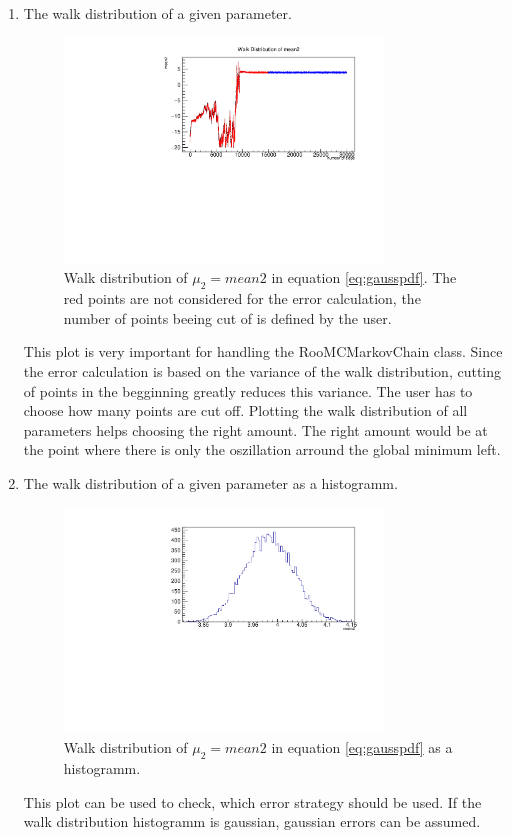 \documentclass[english]{uzhpub}
\begin{document}
\begin{enumerate}
  \item The walk distribution of a given parameter.
  \begin{figure}[H]
    \centering
    \includegraphics[width=0.8\textwidth]{RooMCMC/walkDis}
    \caption{Walk distribution of $\mu_2 = mean2$ in equation \ref{eq:gausspdf}. The red points are not considered for the error calculation, the number of points beeing cut of is defined by the user.}
    \label{fig:walkDis}
  \end{figure}
  This plot is very important for handling the RooMCMarkovChain class. Since the error calculation is based on the variance of the walk distribution, cutting of points in the begginning greatly reduces this variance. The user has to choose how many points are cut off. Plotting the walk distribution of all parameters helps choosing the right amount. The right amount would be at the point where there is only the oszillation arround the global minimum left. \\

  \item The walk distribution of a given parameter as a histogramm.
  \begin{figure}[H]
    \centering
    \includegraphics[width=0.8\textwidth]{RooMCMC/walkDisHis}
    \caption{Walk distribution of $\mu_2 = mean2$ in equation \ref{eq:gausspdf} as a histogramm.}
    \label{fig:walkDisHis}
  \end{figure}
  This plot can be used to check, which error strategy should be used. If the walk distribution histogramm is gaussian, gaussian errors can be assumed. \\


\end{enumerate}
\end{document}

